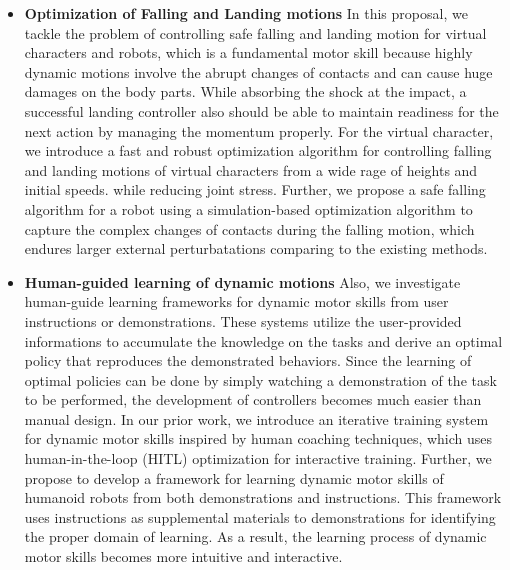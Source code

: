 \begin{itemize}
\item 
  \textbf{Optimization of Falling and Landing motions}
  In this proposal, we tackle the problem of controlling safe falling 
  and landing motion for virtual characters and robots, which is a fundamental
  motor skill because highly dynamic motions involve the abrupt changes
  of contacts and can cause huge damages on the body parts.
  While absorbing the shock at the impact, a successful landing controller 
  also should be able to maintain readiness for the next action by managing
  the momentum properly.
  For the virtual character, we introduce a fast and robust optimization 
  algorithm for controlling falling and landing motions of virtual
  characters from a wide rage of heights and initial speeds.
  while reducing joint stress.
  Further, we propose a safe falling algorithm for a robot using
  a simulation-based optimization algorithm to capture the complex
  changes of contacts during the falling motion, which endures larger 
  external perturbatations comparing to the existing methods.
\item 
  \textbf{Human-guided learning of dynamic motions}
  Also, we investigate human-guide learning frameworks for dynamic
  motor skills from user instructions or demonstrations.
  These systems utilize the user-provided informations to
  accumulate the knowledge on the tasks and derive
  an optimal policy that reproduces the demonstrated behaviors.
  Since the learning of optimal policies can be done by simply
  watching a demonstration of the task to be performed,
  the development of controllers becomes much easier 
  than manual design.
  In our prior work, we introduce an iterative training system for dynamic
  motor skills inspired by human coaching techniques, which uses 
  human-in-the-loop (HITL) optimization for interactive training.  
  Further, we propose to develop a framework for learning 
  dynamic motor skills of humanoid robots
  from both demonstrations and instructions.
  This framework uses instructions as supplemental
  materials to demonstrations for identifying the proper domain
  of learning.
  As a result, the learning process of dynamic motor skills 
  becomes more intuitive and interactive.

\end{itemize}

